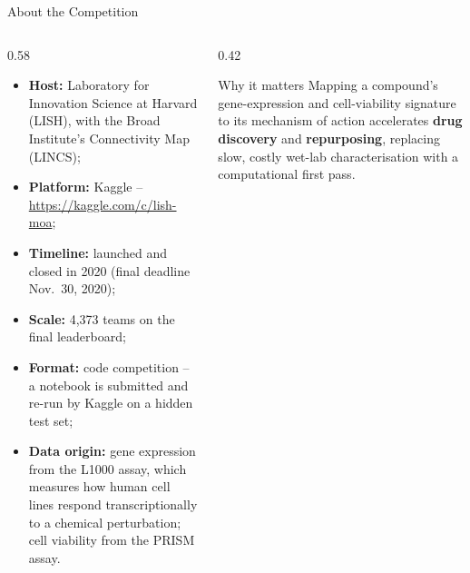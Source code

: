 \documentclass[9pt,aspectratio=169]{beamer}
\begin{document}
\begin{frame}{About the Competition}
  \begin{columns}[T]
    \begin{column}{0.58\textwidth}
      \begin{itemize}
        \item \textbf{Host:} Laboratory for Innovation Science at Harvard (LISH), with the Broad Institute's Connectivity Map (LINCS);
        \item \textbf{Platform:} Kaggle -- \url{https://kaggle.com/c/lish-moa};
        \item \textbf{Timeline:} launched and closed in 2020 (final deadline Nov.\ 30, 2020);
        \item \textbf{Scale:} 4,373 teams on the final leaderboard;
        \item \textbf{Format:} code competition -- a notebook is submitted and re-run by Kaggle on a hidden test set;
        \item \textbf{Data origin:} gene expression from the L1000 assay, which measures how human cell lines respond transcriptionally to a chemical perturbation; cell viability from the PRISM assay.
      \end{itemize}
    \end{column}
    \begin{column}{0.42\textwidth}
      \begin{block}{Why it matters}
        Mapping a compound's gene-expression and cell-viability signature to its mechanism of action accelerates \textbf{drug discovery} and \textbf{repurposing}, replacing slow, costly wet-lab characterisation with a computational first pass.
      \end{block}
    \end{column}
  \end{columns}
\end{frame}
\end{document}
